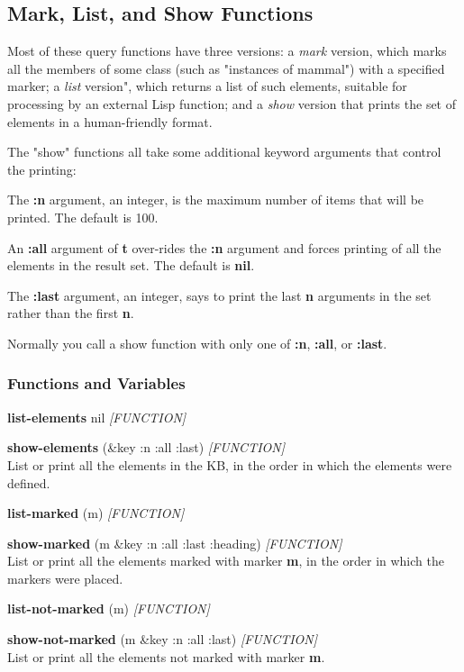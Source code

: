 \documentclass[titlepage,twoside,openright,11pt]{article}
\begin{document}
\subsection{Mark, List, and Show
Functions}\label{mark-list-and-show-functions}

Most of these query functions have three versions: a \emph{mark}
version, which marks all the members of some class (such as "instances
of mammal") with a specified marker; a \emph{list} version", which
returns a list of such elements, suitable for processing by an external
Lisp function; and a \emph{show} version that prints the set of elements
in a human-friendly format.

The "show" functions all take some additional keyword arguments that
control the printing:

The \textbf{:n} argument, an integer, is the maximum number of items
that will be printed. The default is 100.

An \textbf{:all} argument of \textbf{t} over-rides the \textbf{:n}
argument and forces printing of all the elements in the result set. The
default is \textbf{nil}.

The \textbf{:last} argument, an integer, says to print the last
\textbf{n} arguments in the set rather than the first \textbf{n}.

Normally you call a show function with only one of \textbf{:n},
\textbf{:all}, or \textbf{:last}.

\subsubsection{Functions and Variables}\label{functions-and-variables-8}

\textbf{list-elements} nil \emph{{[}FUNCTION{]}}

\textbf{show-elements} (\&key :n :all :last) \emph{{[}FUNCTION{]}}\\
List or print all the elements in the KB, in the order in which the
elements were defined.

\textbf{list-marked} (m) \emph{{[}FUNCTION{]}}

\textbf{show-marked} (m \&key :n :all :last :heading)
\emph{{[}FUNCTION{]}}\\
List or print all the elements marked with marker \textbf{m}, in the
order in which the markers were placed.

\textbf{list-not-marked} (m) \emph{{[}FUNCTION{]}}

\textbf{show-not-marked} (m \&key :n :all :last) \emph{{[}FUNCTION{]}}\\
List or print all the elements not marked with marker \textbf{m}.
\end{document}
